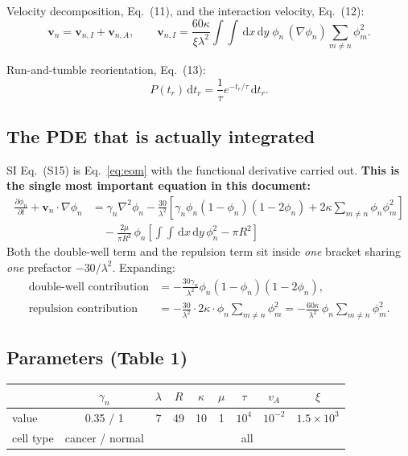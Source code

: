 \documentclass[11pt]{article}
\newcommand{\pn}{\phi_n}
\newcommand{\dd}{\,\mathrm{d}}
\begin{document}
Velocity decomposition, Eq.~(11), and the interaction velocity, Eq.~(12):
\begin{equation}
\mathbf{v}_n = \mathbf{v}_{n,I} + \mathbf{v}_{n,A},
\qquad
\mathbf{v}_{n,I} = \frac{60\kappa}{\xi\lambda^2}
  \int\!\!\!\int \dd x\dd y\;\pn\,(\nabla\pn)\!\!\sum_{m\neq n}\!\phi_m^2 .
\label{eq:vI}
\end{equation}

Run-and-tumble reorientation, Eq.~(13):
\begin{equation}
P(t_r)\dd t_r = \frac{1}{\tau}e^{-t_r/\tau}\dd t_r .
\label{eq:rtp}
\end{equation}

\subsection{The PDE that is actually integrated}

SI Eq.~(S15) is Eq.~\eqref{eq:eom} with the functional derivative carried out.
\textbf{This is the single most important equation in this document:}
\begin{equation}
\boxed{
\begin{aligned}
\frac{\partial\pn}{\partial t} + \mathbf{v}_n\cdot\nabla\pn
&= \gamma_n\nabla^2\pn
 - \frac{30}{\lambda^2}\left[
      \gamma_n\pn(1-\pn)(1-2\pn)
    + 2\kappa\!\!\sum_{m\neq n}\!\pn\phi_m^2
  \right]\\[2pt]
&\quad - \frac{2\mu}{\pi R^2}\,\pn\left[
      \int\!\!\!\int \dd x\dd y\,\pn^2 - \pi R^2
  \right]
\end{aligned}}
\label{eq:S15}
\end{equation}
Both the double-well term and the repulsion term sit inside \emph{one} bracket
sharing \emph{one} prefactor $-30/\lambda^2$. Expanding:
\begin{align}
\text{double-well contribution} &= -\frac{30\gamma_n}{\lambda^2}\pn(1-\pn)(1-2\pn),\\
\text{repulsion contribution}   &= -\frac{30}{\lambda^2}\cdot 2\kappa \cdot \pn\!\!\sum_{m\neq n}\!\phi_m^2
                                 = -\frac{60\kappa}{\lambda^2}\,\pn\!\!\sum_{m\neq n}\!\phi_m^2 .
\label{eq:target}
\end{align}

\subsection{Parameters (Table 1)}

\begin{center}
\begin{tabular}{lcccccccc}
\toprule
& $\gamma_n$ & $\lambda$ & $R$ & $\kappa$ & $\mu$ & $\tau$ & $v_A$ & $\xi$ \\
\midrule
value & 0.35 / 1 & 7 & 49 & 10 & 1 & $10^4$ & $10^{-2}$ & $1.5\times10^3$ \\
cell type & cancer / normal & \multicolumn{7}{c}{all} \\
\bottomrule
\end{tabular}
\end{center}
\end{document}
